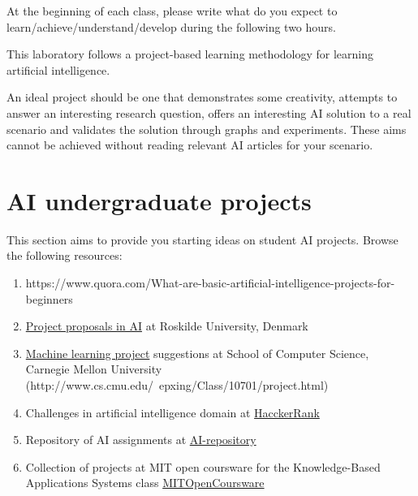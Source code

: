 \documentclass[a4paper,12pt]{report}
\begin{document}
At the beginning of each class, please write what do you expect to learn/achieve/understand/develop during the following two hours.

\vspace{0.2cm}

\colorbox{blue!20}{}
\vspace{0.2cm}
This laboratory follows a project-based learning methodology for learning artificial intelligence.

An ideal project should be one that demonstrates some creativity, 
attempts to answer an interesting research question, 
offers an interesting AI solution to a real scenario and validates the solution through graphs and experiments.
These aims cannot be achieved without reading relevant AI articles for your scenario.

\section{AI undergraduate projects}
This section aims to provide you starting ideas on student AI projects.
Browse the following resources:  
\begin{enumerate}
\item https://www.quora.com/What-are-basic-artificial-intelligence-projects-for-beginners
 \item \href{http://www.akira.ruc.dk/~keld/teaching/projektforslag/ai_projects.pdf}{Project proposals in AI} at Roskilde University, Denmark
\item \href{http://www.cs.cmu.edu/~./10701/projects.html}{Machine learning project} suggestions at School of Computer Science, Carnegie Mellon University (http://www.cs.cmu.edu/~epxing/Class/10701/project.html)  
\item Challenges in artificial intelligence domain at \href{https://www.hackerrank.com/domains}{HacckerRank}
\item Repository of AI assignments at \href{http://modelai.gettysburg.edu/}{AI-repository}
\item Collection of projects at MIT open coursware for the Knowledge-Based Applications Systems class
\href{http://ocw.mit.edu/courses/electrical-engineering-and-computer-science/6-871-knowledge-based-applications-systems-spring-2005/projects/}{MITOpenCoursware}
\end{enumerate}
\end{document}
